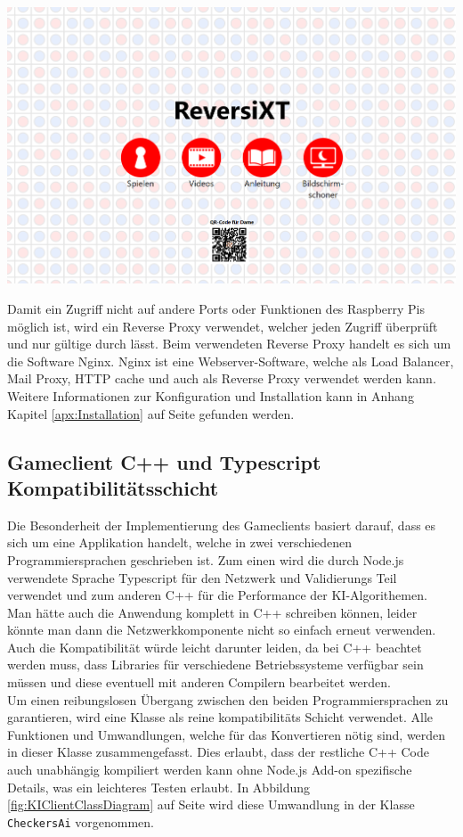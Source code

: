 \documentclass[12pt,a4paper,bibliography=totocnumbered,listof=totocnumbered]{article}
\begin{document}
\vspace{1em}
\begin{minipage}{\linewidth}
	\centering
	\includegraphics[width=0.7\linewidth]{pics/mainMenuWithQR.png}
	\label{fig:QRCodeScreen}
\end{minipage}

Damit ein Zugriff nicht auf andere Ports oder Funktionen des Raspberry Pis möglich ist,
wird ein Reverse Proxy verwendet, welcher jeden Zugriff überprüft und nur gültige durch lässt. Beim verwendeten Reverse Proxy handelt 
es sich um die Software Nginx. Nginx ist eine Webserver-Software, welche als Load Balancer, Mail Proxy, HTTP cache und auch 
als Reverse Proxy verwendet werden kann. Weitere Informationen zur Konfiguration und Installation kann in Anhang Kapitel \ref{apx:Installation} 
auf Seite \pageref{apx:Installation} gefunden werden.


\subsection{Gameclient C++ und Typescript Kompatibilitätsschicht}
Die Besonderheit der Implementierung des Gameclients basiert darauf, dass es sich um eine Applikation handelt, welche in zwei verschiedenen 
Programmiersprachen geschrieben ist. Zum einen wird die durch Node.js verwendete Sprache Typescript für den Netzwerk und Validierungs Teil 
verwendet und zum anderen C++ für die Performance der KI-Algorithemen. Man hätte auch die Anwendung komplett in C++ schreiben können, leider 
könnte man dann die Netzwerkkomponente nicht so einfach erneut verwenden. Auch die Kompatibilität würde leicht darunter leiden, da 
bei C++ beachtet werden muss, dass Libraries für verschiedene Betriebssysteme verfügbar sein müssen und diese eventuell mit anderen 
Compilern bearbeitet werden. 
\\
Um einen reibungslosen Übergang zwischen den beiden Programmiersprachen zu garantieren, wird eine Klasse als reine kompatibilitäts Schicht verwendet.
Alle Funktionen und Umwandlungen, welche für das Konvertieren nötig sind, werden in dieser Klasse zusammengefasst. Dies erlaubt, dass der restliche 
C++ Code auch unabhängig kompiliert werden kann ohne Node.js Add-on spezifische Details, was ein leichteres Testen erlaubt.
In Abbildung \ref{fig:KIClientClassDiagram} auf Seite \pageref{fig:KIClientClassDiagram} wird diese Umwandlung in der Klasse \texttt{CheckersAi} 
vorgenommen.
\end{document}
